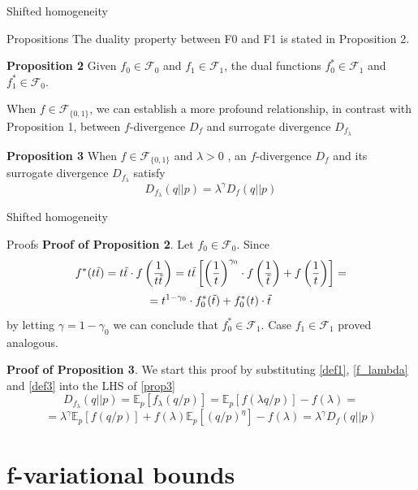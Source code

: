 \documentclass{beamer}
\begin{document}
\begin{frame}{Shifted homogeneity}
    \begin{block}{Propositions}
        The duality property between F0 and F1 is stated in Proposition 2.

        \textbf{Proposition 2} Given $f_0 \in \mathcal{F}_0$ and $f_1 \in \mathcal{F}_1$, the dual functions $f_0^* \in \mathcal{F}_1$ and $f_1^* \in \mathcal{F}_0$. 

        When $f \in \mathcal{F}_{\{0,1\}}$, we can establish a more profound relationship, in contrast with Proposition 1, between $f$-divergence $D_f$ and surrogate divergence $D_{f_\lambda}$

        \textbf{Proposition 3} When $f \in \mathcal{F}_{\{0,1\}}$ and $\lambda > 0$ , an $f$-divergence $D_f$ and its surrogate divergence $D_{f_\lambda}$ satisfy
        \begin{equation}\label{prop3}
            D_{f_{\lambda}}(q||p) = \lambda^\gamma D_f(q||p)
        \end{equation}
    \end{block}
\end{frame}

\begin{frame}{Shifted homogeneity}
    \begin{block}{Proofs}
        \textbf{Proof of Proposition 2}. Let $f_0 \in \mathcal{F}_0$. Since
        $$f^*(t\Tilde{t}) = t\Tilde{t}\cdot f\left(\dfrac{1}{t\Tilde{t}}\right) = t\Tilde{t}\left[\left(\dfrac{1}{t}\right)^{\gamma_0}\cdot f\left(\dfrac{1}{\Tilde{t}}\right) + f\left(\dfrac{1}{t}\right)\right]=$$
        $$= t^{1-\gamma_0}\cdot f^*_0(\Tilde{t}) + f^*_0(t)\cdot\Tilde{t}$$
        by letting $\gamma=1-\gamma_0$  we can conclude that $f_0^*\in\mathcal{F}_1$. Case $f_1 \in \mathcal{F}_1$ proved analogous.

        \textbf{Proof of Proposition 3}. We start this proof by substituting \eqref{def1}, \eqref{f_lambda} and \eqref{def3} into the LHS of \eqref{prop3}
        $$D_{f_{\lambda}}(q||p) = \mathbb{E}_p[f_\lambda(q/p)] = \mathbb{E}_p[f(\lambda q/p)] - f(\lambda) = $$
        $$= \lambda^\gamma\mathbb{E}_p[f(q/p)] + f(\lambda)\mathbb{E}_p[(q/p)^\eta] - f(\lambda) = \lambda^\gamma D_f(q||p)$$
    \end{block}
\end{frame}

\section{f-variational bounds}
\end{document}
